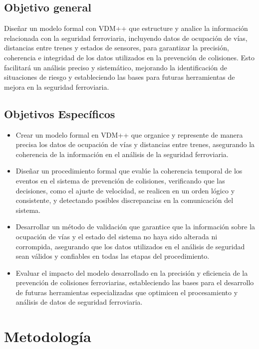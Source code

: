\documentclass[journal]{IEEEtran}
\begin{document}
\subsection{Objetivo general}  
Diseñar un modelo formal con VDM++ que estructure y analice la información relacionada con la seguridad ferroviaria, incluyendo datos de ocupación de vías, distancias entre trenes y estados de sensores, para garantizar la precisión, coherencia e integridad de los datos utilizados en la prevención de colisiones. Esto facilitará un análisis preciso y sistemático, mejorando la identificación de situaciones de riesgo y estableciendo las bases para futuras herramientas de mejora en la seguridad ferroviaria.  

\subsection{Objetivos Específicos}  

\begin{itemize}  
    \item Crear un modelo formal en VDM++ que organice y represente de manera precisa los datos de ocupación de vías y distancias entre trenes, asegurando la coherencia de la información en el análisis de la seguridad ferroviaria.  

    \item Diseñar un procedimiento formal que evalúe la coherencia temporal de los eventos en el sistema de prevención de colisiones, verificando que las decisiones, como el ajuste de velocidad, se realicen en un orden lógico y consistente, y detectando posibles discrepancias en la comunicación del sistema.  

    \item Desarrollar un método de validación que garantice que la información sobre la ocupación de vías y el estado del sistema no haya sido alterada ni corrompida, asegurando que los datos utilizados en el análisis de seguridad sean válidos y confiables en todas las etapas del procedimiento.  

    \item Evaluar el impacto del modelo desarrollado en la precisión y eficiencia de la prevención de colisiones ferroviarias, estableciendo las bases para el desarrollo de futuras herramientas especializadas que optimicen el procesamiento y análisis de datos de seguridad ferroviaria.  
\end{itemize}  

\section{Metodología}  
\end{document}
